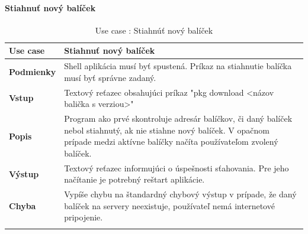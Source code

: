\paragraph{Stiahnuť nový balíček}
\begin{center}
	\begin{longtable}{|p{2.5cm}|p{12.2cm}|}
			\hline
			\textbf{Use case} & Stiahnuť nový balíček \\ 
			\hline
			\textbf{Podmienky} & Shell aplikácia musí byť spustená. Príkaz na stiahnutie balíčka musí byť správne zadaný.\\ 
			\hline
			\textbf{Vstup} & Textový reťazec obsahujúci príkaz "pkg download <názov balička s verziou>"\\
			\hline
			\textbf{Popis} & Program ako prvé skontroluje adresár balíčkov, či daný balíček nebol stiahnutý, ak nie stiahne nový balíček. V opačnom prípade medzi aktívne balíčky načíta používateľom zvolený balíček.\\ 
			\hline
			\textbf{Výstup} & Textový reťazec  informujúci o úspešnosti sťahovania. Pre jeho načítanie je potrebný reštart aplikácie.\\
			\hline

			\textbf{Chyba} & Vypíše chybu na štandardný chybový výstup v prípade, že daný balíček na servery neexistuje, používateľ nemá internetové pripojenie.\\
			\hline
		\caption{Use case : Stiahnúť nový balíček}
		\label{table:1}
		
	\end{longtable}
\end{center}

